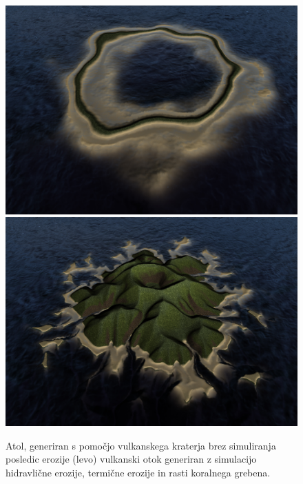 \documentclass[9pt]{pnas-new}
\begin{document}
\begin{figure}
	\begin{adjustwidth}{-2.25in}{0in}
	\centering
	\includegraphics[width=(2.2in+\columnwidth)/2]{final_island_3_new}
	\hfill
	\includegraphics[width=(2.2in+\columnwidth)/2]{final_island_1_new}
	\caption{Atol, generiran s pomočjo vulkanskega kraterja brez simuliranja posledic erozije (levo) vulkanski otok generiran z simulacijo hidravlične erozije, termične erozije in rasti koralnega grebena.}
	\label{fig:final_island_1}
	\end{adjustwidth}
\end{figure}
\end{document}
